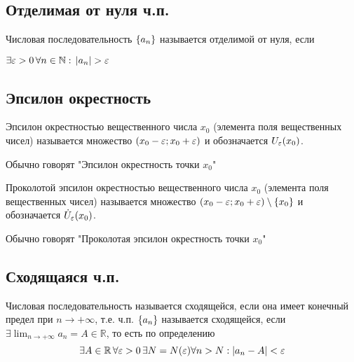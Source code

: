 \subsection{Отделимая от нуля ч.п.}

{
    Числовая последовательность $ \{ a_n \} $ называется отделимой от нуля, если

    $ \exists \varepsilon > 0 \, \forall n \in \mathbb{N}: \, | a_n | > \varepsilon $
}

\subsection{Эпсилон окрестность}

{
    Эпсилон окрестностью вещественного числа $ x_0 $ (элемента поля вещественных чисел)
    называется множество $ (x_0 - \varepsilon; x_0 + \varepsilon) $ и обозначается $ U_{\varepsilon}(x_0) $.

    Обычно говорят "Эпсилон окрестность точки $ x_0 $"
}


{
    Проколотой эпсилон окрестностью вещественного числа $ x_0 $ (элемента поля вещественных чисел)
    называется множество $ (x_0 - \varepsilon; x_0 + \varepsilon) \setminus \{ x_0 \} $ и обозначается $ \dot{U}_{\varepsilon}(x_0) $.

    Обычно говорят "Проколотая эпсилон окрестность точки $ x_0 $"
}


\subsection{Сходящаяся ч.п.}

{
    Числовая последовательность называется сходящейся, если она имеет конечный предел при $ n \to +\infty $, т.е.
    ч.п. $ \{ a_n \} $ называется сходящейся, если $ \exists \lim_{n \to +\infty} a_n = A \in \mathbb{R} $, то есть по определению
    \[ \exists A \in \mathbb{R} \, \forall \varepsilon > 0 \, \exists N = N(\varepsilon) \forall n > N: | a_n - A | < \varepsilon \]
}



